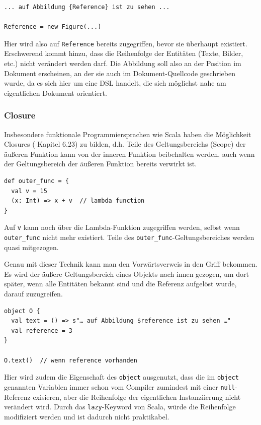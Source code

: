 \begin{lstlisting}
... auf Abbildung {Reference} ist zu sehen ...

Reference = new Figure(...)
\end{lstlisting}

Hier wird also auf \verb|Reference| bereits zugegriffen,
bevor sie überhaupt existiert. Erschwerend kommt hinzu, dass die
Reihenfolge der Entitäten (Texte, Bilder, etc.) nicht verändert werden darf.
Die Abbildung soll also an der Position im Dokument erscheinen, an der sie
auch im Dokument-Quellcode geschrieben wurde, da es sich hier um eine DSL
handelt, die sich möglichst nahe am eigentlichen Dokument orientiert.

\subsubsection{Closure}\label{sec-closure}

Insbesondere funktionale Programmiersprachen wie Scala haben die
Möglichkeit Closures (\cite{scala-ref} Kapitel 6.23) zu bilden,
d.h. Teile des Geltungsbereichs (Scope)
der äußeren Funktion kann von der inneren Funktion beibehalten werden,
auch wenn der Geltungsbereich der äußeren Funktion bereits verwirkt ist.

\begin{lstlisting}
def outer_func = {
  val v = 15
  (x: Int) => x + v  // lambda function
}
\end{lstlisting}

Auf \verb|v| kann noch über die Lambda-Funktion zugegriffen werden,
selbst wenn \verb|outer_func| nicht mehr existiert. Teile des
\verb|outer_func|-Geltungsbereiches werden quasi mitgezogen.

Genau mit dieser Technik kann man den Vorwärtsverweis in den Griff bekommen.
Es wird der äußere Geltungsbereich eines Objekts nach innen gezogen,
um dort später, wenn alle Entitäten bekannt sind und die Referenz aufgelöst
wurde, darauf zuzugreifen.

\begin{lstlisting}
object O {
  val text = () => s"… auf Abbildung $reference ist zu sehen …"
  val reference = 3
}

O.text()  // wenn reference vorhanden
\end{lstlisting}

Hier wird zudem die Eigenschaft des \verb|object| ausgenutzt,
dass die im \verb|object| genannten Variablen immer schon vom Compiler
zumindest mit einer \verb|null|-Referenz exisieren, aber die Reihenfolge
der eigentlichen Instanziierung nicht verändert wird. Durch das
\verb|lazy|-Keyword von Scala, würde die Reihenfolge modifiziert werden
und ist dadurch nicht praktikabel.

